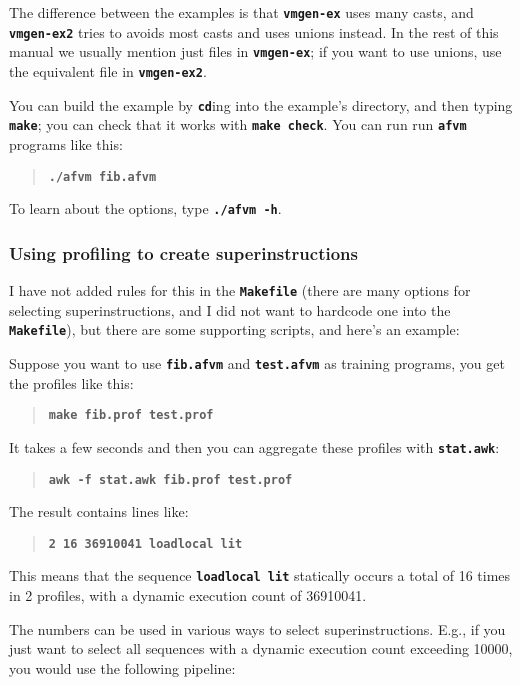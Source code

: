 \documentclass[10pt,english]{article}
\begin{document}
The difference between the examples is that \texttt{\textbf{vmgen-ex}}
uses many casts, and \texttt{\textbf{vmgen-ex2}} tries to avoids most
casts and uses unions instead. In the rest of this manual we usually
mention just files in \texttt{\textbf{vmgen-ex}}; if you want to use
unions, use the equivalent file in \texttt{\textbf{vmgen-ex2}}.

You can build the example by \texttt{\textbf{cd}}ing into the example's
directory, and then typing \texttt{\textbf{make}}; you can check that
it works with \texttt{\textbf{make check}}. You can run run \texttt{\textbf{afvm}}
programs like this:
\begin{quotation}
\texttt{\textbf{./afvm fib.afvm}}
\end{quotation}
To learn about the options, type \texttt{\textbf{./afvm -h}}.


\subsubsection{Using profiling to create superinstructions\label{sub:Using-profiling-to}}

I have not added rules for this in the \texttt{\textbf{Makefile}}
(there are many options for selecting superinstructions, and I did
not want to hardcode one into the \texttt{\textbf{Makefile}}), but
there are some supporting scripts, and here's an example:

Suppose you want to use \texttt{\textbf{fib.afvm}} and \texttt{\textbf{test.afvm}}
as training programs, you get the profiles like this:
\begin{quotation}
\texttt{\textbf{make fib.prof test.prof}}
\end{quotation}
It takes a few seconds and then you can aggregate these profiles with
\texttt{\textbf{stat.awk}}:
\begin{quotation}
\texttt{\textbf{awk -f stat.awk fib.prof test.prof}}
\end{quotation}
The result contains lines like:
\begin{quotation}
\texttt{\textbf{2 16 36910041 loadlocal lit}}
\end{quotation}
This means that the sequence \texttt{\textbf{loadlocal lit}} statically
occurs a total of 16 times in 2 profiles, with a dynamic execution
count of 36910041.

The numbers can be used in various ways to select superinstructions.
E.g., if you just want to select all sequences with a dynamic execution
count exceeding 10000, you would use the following pipeline:
\end{document}
